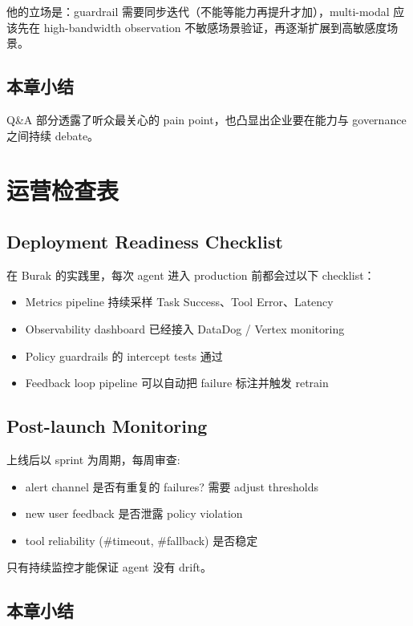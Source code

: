 \documentclass[a4paper]{article}
\begin{document}
他的立场是：guardrail 需要同步迭代（不能等能力再提升才加），multi-modal 应该先在 high-bandwidth observation 不敏感场景验证，再逐渐扩展到高敏感度场景。

\subsection{本章小结}

Q\&A 部分透露了听众最关心的 pain point，也凸显出企业要在能力与 governance 之间持续 debate。

\section{运营检查表}

\subsection{Deployment Readiness Checklist}

在 Burak 的实践里，每次 agent 进入 production 前都会过以下 checklist：

\begin{itemize}
    \item Metrics pipeline 持续采样 Task Success、Tool Error、Latency
    \item Observability dashboard 已经接入 DataDog / Vertex monitoring
    \item Policy guardrails 的 intercept tests 通过
    \item Feedback loop pipeline 可以自动把 failure 标注并触发 retrain
\end{itemize}

\subsection{Post-launch Monitoring}

上线后以 sprint 为周期，每周审查:

\begin{itemize}
    \item alert channel 是否有重复的 failures? 需要 adjust thresholds
    \item new user feedback 是否泄露 policy violation
    \item tool reliability (\#timeout, \#fallback) 是否稳定
\end{itemize}

只有持续监控才能保证 agent 没有 drift。

\subsection{本章小结}
\end{document}
